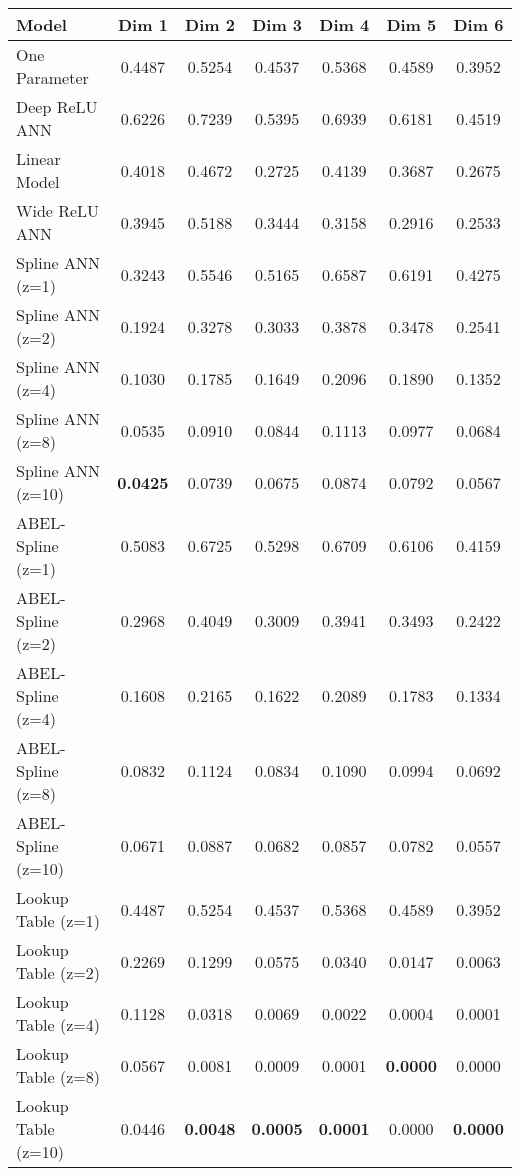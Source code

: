 \begin{table}
\begin{tabular}{|l|c|c|c|c|c|c|}
\hline
Model & Dim 1 & Dim 2 & Dim 3 & Dim 4 & Dim 5 & Dim 6 \\ \hline
One Parameter & 0.4487 & 0.5254 & 0.4537 & 0.5368 & 0.4589 & 0.3952 \\ \hline
Deep ReLU ANN & 0.6226 & 0.7239 & 0.5395 & 0.6939 & 0.6181 & 0.4519 \\ \hline
Linear Model & 0.4018 & 0.4672 & 0.2725 & 0.4139 & 0.3687 & 0.2675 \\ \hline
Wide ReLU ANN & 0.3945 & 0.5188 & 0.3444 & 0.3158 & 0.2916 & 0.2533 \\ \hline
Spline ANN (z=1) & 0.3243 & 0.5546 & 0.5165 & 0.6587 & 0.6191 & 0.4275 \\ \hline
Spline ANN (z=2) & 0.1924 & 0.3278 & 0.3033 & 0.3878 & 0.3478 & 0.2541 \\ \hline
Spline ANN (z=4) & 0.1030 & 0.1785 & 0.1649 & 0.2096 & 0.1890 & 0.1352 \\ \hline
Spline ANN (z=8) & 0.0535 & 0.0910 & 0.0844 & 0.1113 & 0.0977 & 0.0684 \\ \hline
Spline ANN (z=10) & \textbf{0.0425} & 0.0739 & 0.0675 & 0.0874 & 0.0792 & 0.0567 \\ \hline
ABEL-Spline (z=1) & 0.5083 & 0.6725 & 0.5298 & 0.6709 & 0.6106 & 0.4159 \\ \hline
ABEL-Spline (z=2) & 0.2968 & 0.4049 & 0.3009 & 0.3941 & 0.3493 & 0.2422 \\ \hline
ABEL-Spline (z=4) & 0.1608 & 0.2165 & 0.1622 & 0.2089 & 0.1783 & 0.1334 \\ \hline
ABEL-Spline (z=8) & 0.0832 & 0.1124 & 0.0834 & 0.1090 & 0.0994 & 0.0692 \\ \hline
ABEL-Spline (z=10) & 0.0671 & 0.0887 & 0.0682 & 0.0857 & 0.0782 & 0.0557 \\ \hline
Lookup Table (z=1) & 0.4487 & 0.5254 & 0.4537 & 0.5368 & 0.4589 & 0.3952 \\ \hline
Lookup Table (z=2) & 0.2269 & 0.1299 & 0.0575 & 0.0340 & 0.0147 & 0.0063 \\ \hline
Lookup Table (z=4) & 0.1128 & 0.0318 & 0.0069 & 0.0022 & 0.0004 & 0.0001 \\ \hline
Lookup Table (z=8) & 0.0567 & 0.0081 & 0.0009 & 0.0001 & \textbf{0.0000} & 0.0000 \\ \hline
Lookup Table (z=10) & 0.0446 & \textbf{0.0048} & \textbf{0.0005} & \textbf{0.0001} & 0.0000 & \textbf{0.0000} \\ \hline
\end{tabular}
\end{table}
